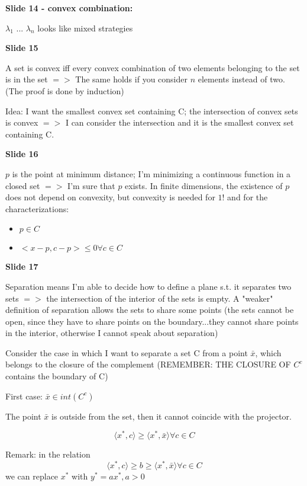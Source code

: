 \documentclass[pt11,a4paper,twoside,reqno,openright]{paper}
\begin{document}
\bigskip
\noindent \textbf{Slide 14 - convex combination:}

\noindent $\lambda_1$ ... $\lambda_n$ looks like mixed strategies


\bigskip
\noindent \textbf{Slide 15}

\noindent A set is convex iff every convex combination of two
elements belonging to the set is in the set
$=>$
The same holds if you consider $n$ elements instead of two.
(The proof is done by induction)

\noindent Idea: I want the smallest convex set containing C; the intersection
of convex sets is convex $=>$ I can consider the intersection
and it is the smallest convex set containing C.

\bigskip
\noindent \textbf{Slide 16}

\noindent $p$ is the point at minimum distance; I'm minimizing a continuous 
function in a closed set $=>$ I'm sure that $p$ exists. In finite
dimensions, the existence of $p$ does not depend on convexity, but 
convexity is needed for $1!$ and for the characterizations:
\begin{itemize}
\item $p \in C$
\item $<x-p, c-p> \leq 0 \forall c \in C$
\end{itemize}

\bigskip
\noindent \textbf{Slide 17}

\noindent Separation means I'm able to decide how to define a plane s.t. it
separates two sets $=>$ the intersection of the interior of the sets 
is empty. 
A "weaker" definition of separation allows the sets to share some
points (the sets cannot be open, since they have to share points
on the boundary...they cannot share points in the interior, otherwise
I cannot speak about separation)

\noindent Consider the case in which I want to separate a set C from a point
$\bar{x}$, which belongs to the closure of the complement (REMEMBER:
THE CLOSURE OF $C^c$ contains the boundary of C)

\noindent First case: $\bar{x} \in int(C^c)$

\noindent The point $\bar{x}$ is outside from the set, then it cannot coincide
with the projector.

\[\langle x^*,c \rangle \geq \langle x^*, \bar{x} \rangle \forall c \in C\]

\noindent Remark: in the relation 
\[\langle x^*,c \rangle \geq b \geq \langle x^*, \bar{x} \rangle 
\forall c \in C\]
we can replace $x^*$ with $y^* = ax^*, a > 0$
\end{document}
